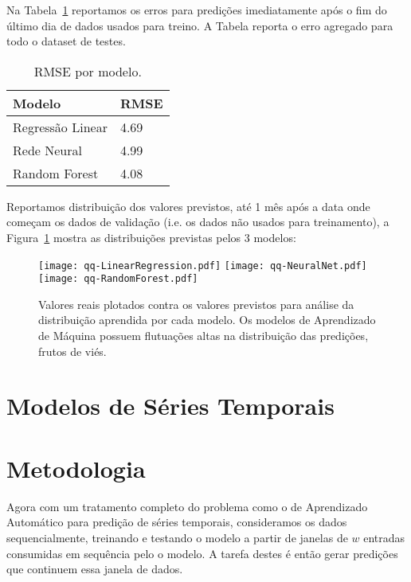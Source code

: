 Na Tabela~\ref{tb:rmse_lin} reportamos os erros para predições imediatamente
após o fim do último dia de dados usados para treino. A Tabela reporta o erro agregado
para todo o dataset de testes.

\begin{center}
\begin{table}[htbp]
\caption{RMSE por modelo.}
\centering
\begin{tabular}{|l|l|}
    \hline
    Modelo           & RMSE \\ \hline
    Regressão Linear & 4.69 \\ \hline
    Rede Neural      & 4.99 \\ \hline
    Random Forest    & 4.08 \\ \hline
  \end{tabular}
\label{tb:rmse_lin}
\end{table}
\end{center}

 Reportamos distribuição dos valores previstos, até 1 mês após a data
onde começam os dados de validação (i.e. os dados não usados para treinamento),
a Figura~\ref{fig:distr_lin} mostra as distribuições previstas pelos 3 modelos:

\begin{figure}[H]
\centering
\texttt{[image: qq-LinearRegression.pdf]} \hfill
\texttt{[image: qq-NeuralNet.pdf]} \hfill
\texttt{[image: qq-RandomForest.pdf]} 
\caption{Valores reais plotados contra os valores previstos para análise da
  distribuição aprendida por cada modelo. Os modelos de Aprendizado de Máquina
  possuem flutuações altas na distribuição das predições, frutos de viés.} 
\label{fig:distr_lin}
\end{figure}


\section{Modelos de Séries Temporais}

\section{Metodologia}

Agora com um tratamento completo do problema como o de Aprendizado Automático para predição de séries
temporais, consideramos os dados sequencialmente, treinando e testando o modelo a partir de janelas de $w$
entradas consumidas em sequência pelo o modelo. A tarefa destes é então gerar
predições que continuem essa janela de dados. 

